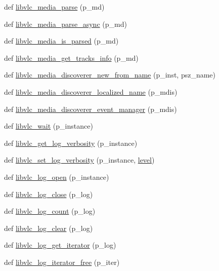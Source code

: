 \begin{DoxyCompactItemize}
def \hyperlink{namespacevlc_ab3d4fc6015921771f0ec5292b51ec157}{libvlc\+\_\+media\+\_\+parse} (p\+\_\+md)
\item 
def \hyperlink{namespacevlc_a37423ae6fdd1861b4823c167ec4662d1}{libvlc\+\_\+media\+\_\+parse\+\_\+async} (p\+\_\+md)
\item 
def \hyperlink{namespacevlc_af75d6b6731001b99235738f78e0cf67f}{libvlc\+\_\+media\+\_\+is\+\_\+parsed} (p\+\_\+md)
\item 
def \hyperlink{namespacevlc_ac5660b2bf617ac8dfd1ea85a31a42b66}{libvlc\+\_\+media\+\_\+get\+\_\+tracks\+\_\+info} (p\+\_\+md)
\item 
def \hyperlink{namespacevlc_a767b87c1a19544f94b98794de5728cde}{libvlc\+\_\+media\+\_\+discoverer\+\_\+new\+\_\+from\+\_\+name} (p\+\_\+inst, psz\+\_\+name)
\item 
def \hyperlink{namespacevlc_a3b2a41bfb1a505c80af56dad8ce507ac}{libvlc\+\_\+media\+\_\+discoverer\+\_\+localized\+\_\+name} (p\+\_\+mdis)
\item 
def \hyperlink{namespacevlc_ae17b8e9a27594920a38298179a0198e6}{libvlc\+\_\+media\+\_\+discoverer\+\_\+event\+\_\+manager} (p\+\_\+mdis)
\item 
def \hyperlink{namespacevlc_a613ca585b96e960eb518af03fec03484}{libvlc\+\_\+wait} (p\+\_\+instance)
\item 
def \hyperlink{namespacevlc_a137f63c88981266f69851dd13a25658e}{libvlc\+\_\+get\+\_\+log\+\_\+verbosity} (p\+\_\+instance)
\item 
def \hyperlink{namespacevlc_aca5f2f88af6fc65ce68b4a68a0e1cf5a}{libvlc\+\_\+set\+\_\+log\+\_\+verbosity} (p\+\_\+instance, \hyperlink{namespacevlc_afde8e18a788ccc92fc61cab298bca7e3}{level})
\item 
def \hyperlink{namespacevlc_a03e79554e536d7e5cb215042e619966e}{libvlc\+\_\+log\+\_\+open} (p\+\_\+instance)
\item 
def \hyperlink{namespacevlc_a403030949bc4a5343c6a01b162395981}{libvlc\+\_\+log\+\_\+close} (p\+\_\+log)
\item 
def \hyperlink{namespacevlc_a9743e8e0f94d5dc4855f541f9d736d7c}{libvlc\+\_\+log\+\_\+count} (p\+\_\+log)
\item 
def \hyperlink{namespacevlc_a1cc8217001030138b1f0ada005ce72d9}{libvlc\+\_\+log\+\_\+clear} (p\+\_\+log)
\item 
def \hyperlink{namespacevlc_acc5cfe5868875686d30894d6a631b517}{libvlc\+\_\+log\+\_\+get\+\_\+iterator} (p\+\_\+log)
\item 
def \hyperlink{namespacevlc_a37c59e68be0d4bce98e1f75b4468493b}{libvlc\+\_\+log\+\_\+iterator\+\_\+free} (p\+\_\+iter)

\end{DoxyCompactItemize}
